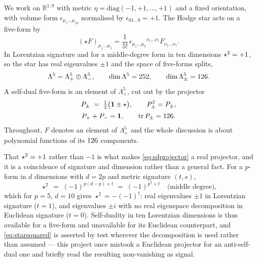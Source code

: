 \documentclass[11pt,a4paper]{article}
\theoremstyle{definition}
\theoremstyle{remark}
\begin{document}
We work on $\mathbb{R}^{1,9}$ with metric $\eta = \mathrm{diag}(-1,+1,\dots,+1)$
and a fixed orientation, with volume form $\epsilon_{\mu_1\dots\mu_{10}}$
normalised by $\epsilon_{01\dots 9} = +1$. The Hodge star acts on a five-form by
\begin{equation}
(\star F)_{\mu_1\dots\mu_5}
 = \frac{1}{5!}\,\epsilon_{\mu_1\dots\mu_5}{}^{\nu_1\dots\nu_5}
   F_{\nu_1\dots\nu_5}.
\end{equation}
In Lorentzian signature and for a middle-degree form in ten dimensions
$\star^2 = +1$, so the star has real eigenvalues $\pm 1$ and the
space of five-forms splits,
\begin{equation}
\Lambda^5 = \Lambda^5_+ \oplus \Lambda^5_-,
\qquad
\dim \Lambda^5 = 252,
\qquad
\dim \Lambda^5_\pm = 126 .
\end{equation}
A self-dual five-form is an element of $\Lambda^5_+$, cut out by the projector
\begin{equation}
\begin{gathered}
P_\pm \;=\; \tfrac12\bigl(\mathbf{1} \pm \star\bigr),
\qquad
P_\pm^{2} = P_\pm,
\\[2pt]
P_+ + P_- = \mathbf{1},
\qquad
\operatorname{tr} P_\pm = 126 .
\end{gathered}
\label{eq:sdprojector}
\end{equation}
Throughout, $F$ denotes an element of $\Lambda^5_+$ and the whole discussion is
about polynomial functions of its $126$ components.

That $\star^2 = +1$ rather than $-1$ is what makes
\eqref{eq:sdprojector} a real projector, and it is a coincidence of signature and
dimension rather than a general fact. For a $p$-form in $d$ dimensions with
$d = 2p$ and metric signature $(t,s)$,
\begin{equation}
\star^{2} \;=\; (-1)^{p(d-p)+t} \;=\; (-1)^{p^{2}+t}
\quad\text{(middle degree),}
\label{eq:starsquared}
\end{equation}
which for $p = 5$, $d = 10$ gives $\star^2 = -(-1)^{t}$: real eigenvalues
$\pm1$ in Lorentzian signature ($t = 1$), and eigenvalues $\pm i$ with no real
eigenspace decomposition in Euclidean signature ($t = 0$). Self-duality in ten
Lorentzian dimensions is thus available for a five-form and unavailable for its
Euclidean counterpart, and \eqref{eq:starsquared} is asserted by test wherever
the decomposition is used rather than assumed --- this project once mistook a
Euclidean projector for an anti-self-dual one and briefly read the resulting
non-vanishing as signal.
\end{document}

